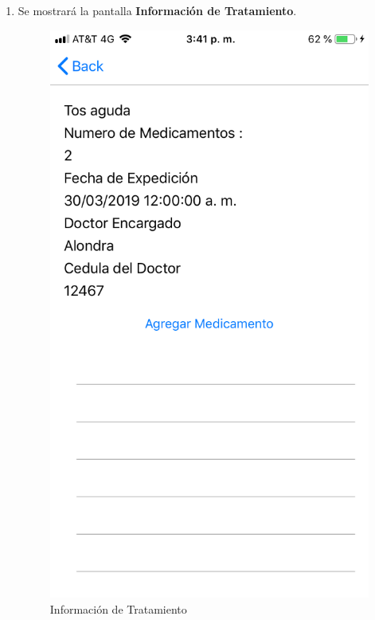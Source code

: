 \begin{enumerate}
	\item Se mostrará la pantalla \textbf{Información de Tratamiento}. 
	\newpage
	
	\begin{figure}[!htbp]			
		\hypertarget{fig:infoTratamiento}{\hspace{1pt}}
		\begin{center}
			\includegraphics[height=0.4\textheight]{Paciente/InfoTratamiento/images/infoTratamiento}
			\caption{Información de Tratamiento}
			\label{fig:infoTratamiento}
		\end{center}
	\end{figure}
	
\end{enumerate}

